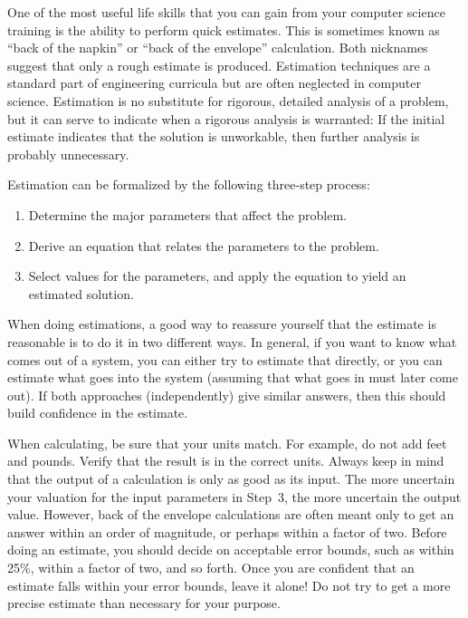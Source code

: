 One
of the most useful life skills that you can gain from your
computer science training is the ability to perform quick estimates.
This is sometimes known as ``back of the napkin'' or ``back of the
envelope'' calculation.
Both nicknames suggest that only a rough estimate is produced.
Estimation techniques are a standard part of engineering
curricula but are often neglected in computer science.
Estimation is no substitute for rigorous, detailed analysis
of a problem, but it can serve to indicate when a rigorous
analysis is warranted:
If the initial estimate indicates that the solution
is unworkable, then further analysis is probably unnecessary.

Estimation can be formalized by the following three-step process:

\begin{enumerate}

\item
Determine the major parameters that affect the problem.

\item
Derive an equation that relates the parameters to the problem.

\item
Select values for the parameters, and apply the equation to yield an
estimated solution.

\end{enumerate}

When doing estimations, a good way to reassure yourself that the
estimate is reasonable is to do it in two different ways.
In general, if you want to know what comes out of a system, you can
either try to estimate that directly, or you can estimate what goes
into the system (assuming that what goes in must later come out).
If both approaches (independently) give similar answers, then this
should build confidence in the estimate.

When calculating, be sure that your units match.
For example, do not add feet and pounds.
Verify that the result is in the correct units.
Always keep in mind that the output of a calculation is only
as good as its input.
The more uncertain your valuation for the input parameters in Step~3,
the more uncertain the output value.
However, back of the envelope calculations are often meant only to get
an answer within an order of magnitude, or perhaps within a factor of
two.
Before doing an estimate, you should decide on acceptable error
bounds, such as within 25\%, within a factor of two, and so forth.
Once you are confident that an estimate falls within your error
bounds, leave it alone!
Do not try to get a more precise estimate than necessary for your
purpose.

